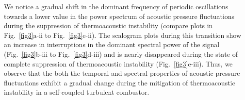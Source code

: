 \documentclass[twocolumn,10pt]{article} %
\begin{document}
We notice a gradual shift in the dominant frequency of periodic oscillations towards a lower value in the power spectrum of acoustic pressure fluctuations during the suppression of thermoacoustic instability (compare plots in Fig.~\ref{fig3}a-ii to Fig.~\ref{fig3}e-ii). The scalogram plots during this transition show an increase in interruptions in the dominant spectral power of the signal (Fig.~\ref{fig3}b-iii to Fig.~\ref{fig3}d-iii) and is nearly disappeared during the state of complete suppression of thermoacoustic instability (Fig.~\ref{fig3}e-iii). Thus, we observe that the both the temporal and spectral properties of acoustic pressure fluctuations exhibit a gradual change during the mitigation of thermoacoustic instability in a self-coupled turbulent combustor. %



\end{document}
